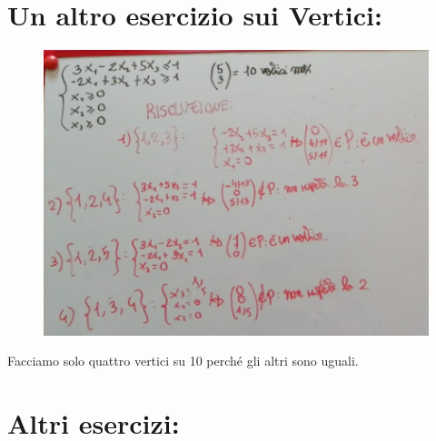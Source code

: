 \section{Un altro esercizio sui Vertici:} 

\begin{figure}[h!]
    \centering
    \includegraphics[scale=0.3]{EsercizioVerticiAncora.jpeg}
\end{figure}
Facciamo solo quattro vertici su 10 perché gli altri sono uguali.



\section{Altri esercizi:}

